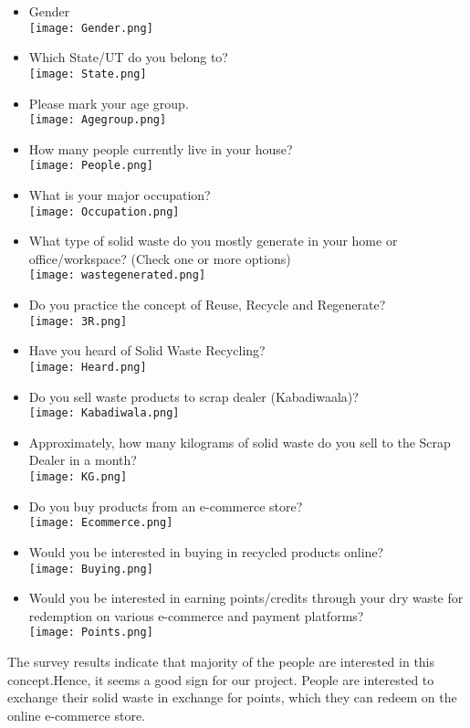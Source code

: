 \documentclass{article}
\begin{document}
\begin{itemize}
    \item Gender\\
    \texttt{[image: Gender.png]}
    \item Which State/UT do you belong to?\\
    \texttt{[image: State.png]}
    \item Please mark your age group.\\
    \texttt{[image: Agegroup.png]}
    \newpage
    \item How many people currently live in your house?\\
    \texttt{[image: People.png]}
    \item What is your major occupation?\\
    \texttt{[image: Occupation.png]}
    \item What type of solid waste do you mostly generate in your home or office/workspace? (Check one or more options)\\
    \texttt{[image: wastegenerated.png]}
    \item Do you practice the concept of Reuse, Recycle and Regenerate?\\
    \texttt{[image: 3R.png]}
    \item Have you heard of Solid Waste Recycling?\\
    \texttt{[image: Heard.png]}
    \item Do you sell waste products to scrap dealer (Kabadiwaala)?\\
    \texttt{[image: Kabadiwala.png]}
    \newpage
    \item Approximately, how many kilograms of solid waste do you sell to the Scrap Dealer in a month?\\
    \texttt{[image: KG.png]}
    \item Do you buy products from an e-commerce store?\\
    \texttt{[image: Ecommerce.png]}
    \item Would you be interested in buying in recycled products online?\\
    \texttt{[image: Buying.png]}
    \newpage
    \item Would you be interested in earning points/credits through your dry waste for redemption on various e-commerce and payment platforms?\\
    \texttt{[image: Points.png]}
\end{itemize}
\par The survey results indicate that majority of the people are interested in this concept.Hence, it seems a good sign for our project. People are interested to exchange their solid waste in exchange for points, which they can redeem on the online e-commerce store.
\end{document}
